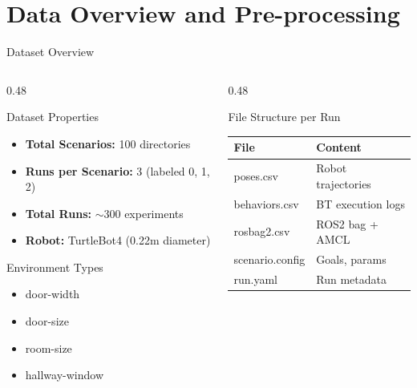 \documentclass[aspectratio=169, 11pt]{beamer}
\begin{document}
\section{Data Overview and Pre-processing}

\begin{frame}{Dataset Overview}
  \begin{columns}[T]
    \begin{column}{0.48\textwidth}
      \begin{block}{Dataset Properties}
        \begin{itemize}
          \item \textbf{Total Scenarios:} 100 directories
          \item \textbf{Runs per Scenario:} 3 (labeled 0, 1, 2)
          \item \textbf{Total Runs:} $\sim$300 experiments
          \item \textbf{Robot:} TurtleBot4 (0.22m diameter)
        \end{itemize}
      \end{block}
      
      \vspace{0.3cm}
      
      \begin{block}{Environment Types}
        \begin{itemize}
          \item door-width
          \item door-size
          \item room-size
          \item hallway-window
        \end{itemize}
      \end{block}
    \end{column}
    
    \begin{column}{0.48\textwidth}
      \begin{block}{File Structure per Run}
        \footnotesize
        \begin{tabular}{@{}l l@{}}
          \toprule
          \textbf{File} & \textbf{Content} \\
          \midrule
          poses.csv & Robot trajectories \\
          behaviors.csv & BT execution logs \\
          rosbag2.csv & ROS2 bag + AMCL \\
          scenario.config & Goals, params \\
          run.yaml & Run metadata \\
          \bottomrule
        \end{tabular}
      \end{block}
    \end{column}
  \end{columns}
\end{frame}
\end{document}
